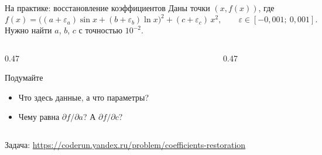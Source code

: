 \begin{frame}[c]{На практике: восстановление коэффициентов}
  \small
  Даны точки $(x, f(x))$, где
  \[f(x) = \bigl((a+\varepsilon_a)\sin x + (b+\varepsilon_b)\ln x\bigr)^2 + (c+\varepsilon_c)\,x^2,
    \qquad \varepsilon \in [-0{,}001;\ 0{,}001].\]
  Нужно найти $a$, $b$, $c$ с точностью $10^{-2}$.

  \medskip
  \begin{columns}[T]
    \begin{column}{0.47\textwidth}
      \begin{block}{Подумайте}
        \small
        \begin{itemize}
          \item Что здесь данные, а что параметры?
          \item Чему равна $\partial f/\partial a$? А $\partial f/\partial c$?
        \end{itemize}
      \end{block}
    \end{column}
    \begin{column}{0.47\textwidth}
    \end{column}
  \end{columns}

  \smallskip
  {\footnotesize\color{acGray}Задача: \url{https://coderun.yandex.ru/problem/coefficients-restoration}\par}
\end{frame}
